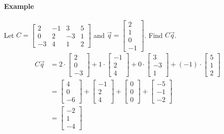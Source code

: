 \paragraph*{Example} Let $C = \begin{bmatrix}
    2 & -1 & 3 & 5 \\
    0 & 2 & -3 & 1  \\
    -3 & 4 & 1 & 2 
\end{bmatrix}$ and $\vec{q} = \begin{bmatrix} 2 \\ 1 \\ 0 \\ -1 \end{bmatrix}$. Find $C\vec{q}$.
\begin{align*}
C\vec{q} &= 2 \cdot \begin{bmatrix} 2 \\ 0 \\ -3 \end{bmatrix} + 1 \cdot \begin{bmatrix} -1 \\ 2 \\ 4 \end{bmatrix} + 0 \cdot \begin{bmatrix} 3 \\ -3 \\ 1 \end{bmatrix} + (-1) \cdot \begin{bmatrix} 5 \\ 1 \\ 2 \end{bmatrix} \\
&= \begin{bmatrix} 4 \\ 0 \\ -6 \end{bmatrix} + \begin{bmatrix} -1 \\ 2 \\ 4 \end{bmatrix} + \begin{bmatrix} 0 \\ 0 \\ 0 \end{bmatrix} + \begin{bmatrix} -5 \\ -1 \\ -2 \end{bmatrix} \\
&= \begin{bmatrix} -2 \\ 1 \\ -4 \end{bmatrix}
\end{align*}

